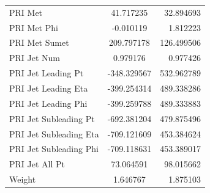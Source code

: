 \documentclass[conference]{IEEEtran}
\begin{document}
\begin{table}[h!]
\begin{center}
\begin{tabular}{l|S|r}
      PRI Met & 41.717235 & 32.894693\\
      PRI Met Phi & -0.010119 & 1.812223\\
      PRI Met Sumet & 209.797178 & 126.499506\\
      PRI Jet Num & 0.979176 & 0.977426\\
      PRI Jet Leading Pt & -348.329567 & 532.962789\\
      PRI Jet Leading Eta & -399.254314 & 489.338286\\
      PRI Jet Leading Phi & -399.259788 & 489.333883\\
      PRI Jet Subleading Pt & -692.381204 & 479.875496\\
      PRI Jet Subleading Eta & -709.121609 & 453.384624\\
      PRI Jet Subleading Phi & -709.118631 & 453.389017\\
      PRI Jet All Pt & 73.064591 & 98.015662\\
      Weight & 1.646767 & 1.875103\\
    \end{tabular}
  \end{center}
\end{table}
\end{document}
